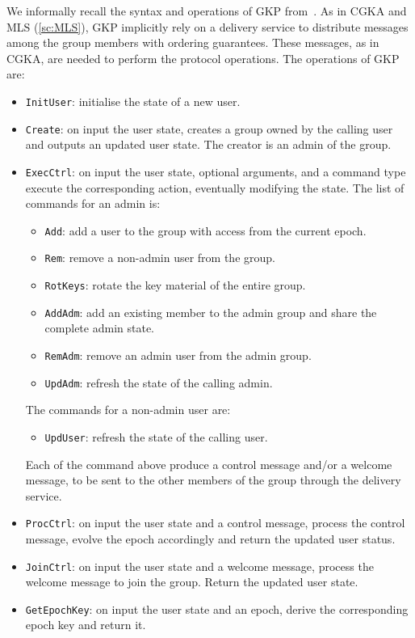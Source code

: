 We informally recall the syntax and operations of GKP from~\cite{GKP}.
As in CGKA and MLS (\cref{sc:MLS}), GKP implicitly rely on a delivery service
to distribute messages among the group members with ordering guarantees.
These messages, as in CGKA, are needed to perform the protocol operations.
The operations of GKP are:
\begin{itemize}
    \item \texttt{InitUser}: initialise the state of a new user.
    \item \texttt{Create}: on input the user state, creates a group owned by the calling user and outputs an updated user state. The creator is an admin of the group.
    \item \texttt{ExecCtrl}: on input the user state, optional arguments, and a command type execute the corresponding action, eventually modifying the state. The list of commands for an admin is:
    \begin{itemize}
        \item \texttt{Add}: add a user to the group with access from the current epoch.
        \item \texttt{Rem}: remove a non-admin user from the group.
        \item \texttt{RotKeys}: rotate the key material of the entire group.
        \item \texttt{AddAdm}: add an existing member to the admin group and share the complete admin state.
        \item \texttt{RemAdm}: remove an admin user from the admin group.
        \item \texttt{UpdAdm}: refresh the state of the calling admin. 
    \end{itemize}
    The commands for a non-admin user are:
    \begin{itemize}
        \item \texttt{UpdUser}: refresh the state of the calling user.
    \end{itemize}
    Each of the command above produce a control message and/or a welcome message, to be sent to the other members of the group through the delivery service.
    \item \texttt{ProcCtrl}: on input the user state and a control message, process the control message, evolve the epoch accordingly and return the updated user status.
    \item \texttt{JoinCtrl}: on input the user state and a welcome message, process the welcome message to join the group. Return the updated user state.
    \item \texttt{GetEpochKey}: on input the user state and an epoch, derive the corresponding epoch key and return it.
\end{itemize}


